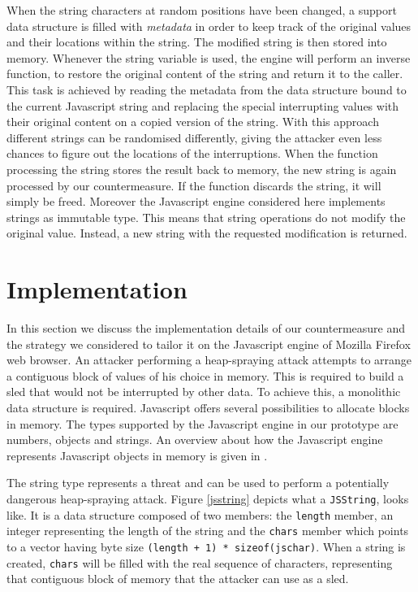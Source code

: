 When the string characters at random positions have been changed, a support data structure is filled with \textit{metadata} in order to keep track of the original values and their locations within the string. The modified string is then stored into memory. Whenever the string variable is used, the engine will perform an inverse function, to restore the original content of the string and return it to the caller. This task is achieved by reading the metadata from the data structure bound to the current Javascript string and replacing the special interrupting values with their original content on a copied version of the string. With this approach different strings can be randomised differently, giving the attacker even less chances to figure out the locations of the interruptions. 
When the function processing the string stores the result back to memory, the new string is again processed by our countermeasure. If the function discards the string, it will simply be freed. Moreover the Javascript engine considered here implements strings as immutable type. This means that string operations do not modify the original value. Instead, a new string with the requested modification is returned.  


\section{Implementation}\label{bub:implementation}
In this section we discuss the implementation details of our countermeasure and the strategy we considered to tailor it on the Javascript engine of Mozilla Firefox web browser.
An attacker performing a heap-spraying attack attempts to arrange a contiguous block of values of his choice in memory. This is required to build a sled that would not be interrupted by other data. To achieve this, a monolithic data structure is required.
Javascript offers several possibilities to allocate blocks in memory. The types supported by the Javascript engine in our prototype are numbers, objects and strings. An overview about how the Javascript engine represents Javascript objects in memory is given in \cite{jsobj}. 

The string type represents a threat and can be used to perform a potentially dangerous heap-spraying attack. Figure \ref{jsstring} depicts what a \texttt{JSString}, looks like.  It is a data structure composed of two members: the \texttt{length} member, an integer representing the length of the string and the \texttt{chars} member which points to a vector having byte size \texttt{(length + 1) * sizeof(jschar)}. When a string is created, \texttt{chars} will be filled with the real sequence of characters, representing that contiguous block of memory that the attacker can use as a sled. 

